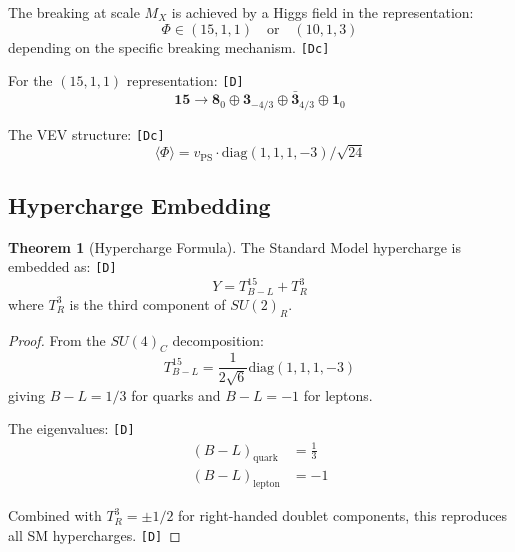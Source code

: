 \documentclass[11pt,a4paper]{article}
\newcommand{\tagD}{\textcolor{green!50!black}{\texttt{[D]}}}
\newcommand{\tagDc}{\textcolor{blue!70!black}{\texttt{[Dc]}}}
\theoremstyle{definition}
\newtheorem{theorem}{Theorem}[section]
\begin{document}
The breaking at scale $M_X$ is achieved by a Higgs field in the representation:
\begin{equation}
\label{eq:ps-higgs}
\Phi \in (15, 1, 1) \quad \text{or} \quad (10, 1, 3)
\end{equation}
depending on the specific breaking mechanism. \tagDc{}

For the $(15, 1, 1)$ representation: \tagD{}
\begin{equation}
\label{eq:15-decomposition}
\mathbf{15} \to \mathbf{8}_0 \oplus \mathbf{3}_{-4/3} \oplus \bar{\mathbf{3}}_{4/3} \oplus \mathbf{1}_0
\end{equation}

The VEV structure: \tagDc{}
\begin{equation}
\label{eq:vev-structure}
\langle \Phi \rangle = v_{\text{PS}} \cdot \text{diag}(1, 1, 1, -3) / \sqrt{24}
\end{equation}

\subsection{Hypercharge Embedding}
\label{subsec:hypercharge}

\begin{theorem}[Hypercharge Formula]
\label{thm:hypercharge}
The Standard Model hypercharge is embedded as: \tagD{}
\begin{equation}
\label{eq:hypercharge}
\boxed{Y = T^{15}_{B-L} + T^3_R}
\end{equation}
where $T^3_R$ is the third component of $SU(2)_R$.
\end{theorem}

\begin{proof}
From the $SU(4)_C$ decomposition:
\begin{equation}
\label{eq:bl-generator}
T^{15}_{B-L} = \frac{1}{2\sqrt{6}} \text{diag}(1, 1, 1, -3)
\end{equation}
giving $B - L = 1/3$ for quarks and $B - L = -1$ for leptons.

The eigenvalues: \tagD{}
\begin{align}
\label{eq:bl-quark}
(B - L)_{\text{quark}} &= \frac{1}{3} \\
\label{eq:bl-lepton}
(B - L)_{\text{lepton}} &= -1
\end{align}

Combined with $T^3_R = \pm 1/2$ for right-handed doublet components,
this reproduces all SM hypercharges. \tagD{}
\end{proof}
\end{document}
